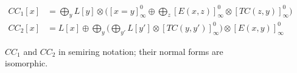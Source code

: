 \begin{figure}
  \begin{align*}
    CC_{1}[x] & = \bigoplus_{y} L[y] \otimes \big([x=y]_{\infty}^{0} \oplus \bigoplus_{z} [E(x,z)]_{\infty}^{0} \otimes [TC(z,y)]_{\infty}^{0}\big) \\
    CC_{2}[x] & = L[x] \oplus \bigoplus_{y} \big( \bigoplus_{y'} L[y'] \otimes [TC(y,y')]_{\infty}^{0}\big) \otimes [E(x,y)]_{\infty}^{0}
  \end{align*}
  \caption{$CC_{1}$ and $CC_{2}$ in semiring notation; their normal
    forms are isomorphic.}
  \label{fig:cc1:semiring}
\end{figure}

